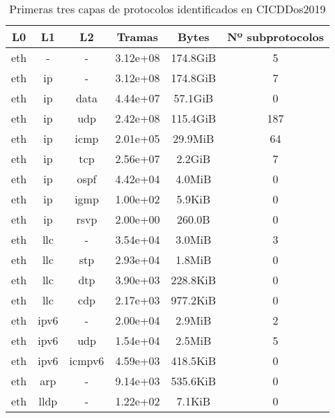 \begin{table}[H]
    \begin{center}
        \begin{tabular}{|c c c | c c c|} 
            \hline
            \textbf{L0} & \textbf{L1} & \textbf{L2} & \textbf{Tramas} & \textbf{Bytes} & \textbf{Nº subprotocolos}\\
            \hline\hline
eth &- &- & 3.12e+08 & 174.8GiB & 5 \\
eth &ip &- & 3.12e+08 & 174.8GiB & 7 \\
eth &ip &data & 4.44e+07 & 57.1GiB & 0 \\
eth &ip &udp & 2.42e+08 & 115.4GiB & 187 \\
eth &ip &icmp & 2.01e+05 & 29.9MiB & 64 \\
eth &ip &tcp & 2.56e+07 & 2.2GiB & 7 \\
eth &ip &ospf & 4.42e+04 & 4.0MiB & 0 \\
eth &ip &igmp & 1.00e+02 & 5.9KiB & 0 \\
eth &ip &rsvp & 2.00e+00 & 260.0B & 0 \\
eth &llc &- & 3.54e+04 & 3.0MiB & 3 \\
eth &llc &stp & 2.93e+04 & 1.8MiB & 0 \\
eth &llc &dtp & 3.90e+03 & 228.8KiB & 0 \\
eth &llc &cdp & 2.17e+03 & 977.2KiB & 0 \\
eth &ipv6 &- & 2.00e+04 & 2.9MiB & 2 \\
eth &ipv6 &udp & 1.54e+04 & 2.5MiB & 5 \\
eth &ipv6 &icmpv6 & 4.59e+03 & 418.5KiB & 0 \\
eth &arp &- & 9.14e+03 & 535.6KiB & 0 \\
eth &lldp &- & 1.22e+02 & 7.1KiB & 0 \\
            \hline
        \end{tabular}
    \end{center}
    \caption{Primeras tres capas de protocolos identificados en CICDDos2019}
    \label{table:cicddos2019protocols}
\end{table}
